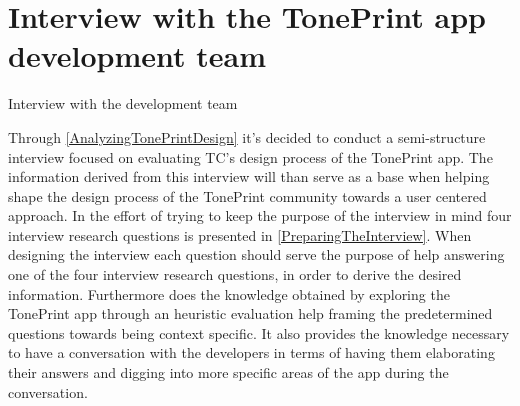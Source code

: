 \chapter{Interview with the TonePrint app development team}
\label{Interview}
\begin{LARGE}
Interview with the development team
\end{LARGE}

%
Through \autoref{AnalyzingTonePrintDesign} it's decided to conduct a semi-structure interview focused on evaluating TC's design process of the TonePrint app. The information derived from this interview will than serve as a base when helping shape the design process of the TonePrint community towards a user centered approach. In the effort of trying to keep the purpose of the interview in mind four interview research questions is presented in \autoref{PreparingTheInterview}. When designing the interview each question should serve the purpose of help answering one of the four interview research questions, in order to derive the desired information. Furthermore does the knowledge obtained by exploring the TonePrint app through an heuristic evaluation help framing the predetermined questions towards being context specific. It also provides the knowledge necessary to have a conversation with the developers in terms of having them elaborating their answers and digging into more specific areas of the app during the conversation. 
%
